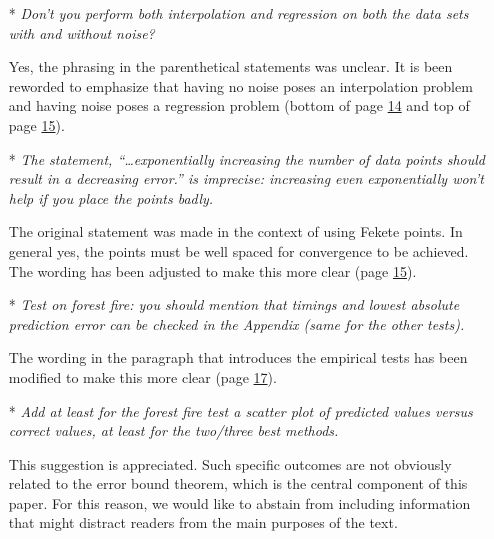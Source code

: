 \begin{itemize}[leftmargin=.5cm]
\item[*] {\it Don’t you perform both interpolation and regression on both the data sets with and without noise?}\vspace{.2cm}

Yes, the phrasing in the parenthetical statements was unclear. It is been reworded to emphasize that having no noise poses an interpolation problem and having noise poses a regression problem (bottom of page \hyperlink{page.14}{14} and top of page \hyperlink{page.15}{15}).

\item[*] {\it The statement, ``\ldots exponentially increasing the number of data points should result in a decreasing error.'' is imprecise: increasing even exponentially won’t help if you place the points badly.}\vspace{.2cm}

The original statement was made in the context of using Fekete points. In general yes, the points must be well spaced for convergence to be achieved. The wording has been adjusted to make this more clear (page \hyperlink{page.15}{15}).

\newpage\setcounter{page}{0}\thispagestyle{empty}
\item[*] {\it Test on forest fire: you should mention that timings and lowest absolute prediction error can be checked in the Appendix (same for the other tests).}\vspace{.2cm}

The wording in the paragraph that introduces the empirical tests has been modified to make this more clear (page \hyperlink{page.17}{17}).

\item[*] {\it Add at least for the forest fire test a scatter plot of predicted values versus correct values, at least for the two/three best methods.}\vspace{.2cm}

This suggestion is appreciated. Such specific outcomes are not obviously related to the error bound theorem, which is the central component of this paper. For this reason, we would like to abstain from including information that might distract readers from the main purposes of the text.


\end{itemize}

\newpage
